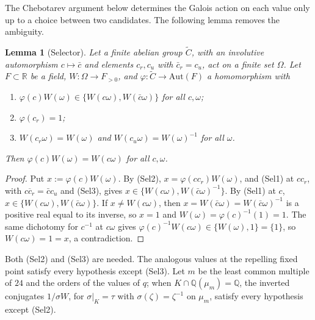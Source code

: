 \documentclass[11pt]{amsart}
\numberwithin{equation}{section}
\theoremstyle{plain}
\newtheorem{lemma}[theorem]{Lemma}
\theoremstyle{definition}
\theoremstyle{remark}
\begin{document}
The Chebotarev argument below determines the Galois action on each value only up to a choice between two candidates. The following lemma removes the ambiguity.

\begin{lemma}[Selector]\label{lem:selector}
Let a finite abelian group \(\widetilde C\), with an involutive automorphism \(c\mapsto\bar c\) and elements \(c_r,c_u\) with \(\bar c_r=c_u\), act on a finite set \(\Omega\). Let \(F\subset\mathbb R\) be a field, \(W:\Omega\to F_{>0}\), and \(\varphi:\widetilde C\to\mathrm{Aut}(F)\) a homomorphism with
\begin{enumerate}
\item[(Sel1)] \(\varphi(c)W(\omega)\in\{W(c\omega),W(\bar c\omega)\}\) for all \(c,\omega\);
\item[(Sel2)] \(\varphi(c_r)=1\);
\item[(Sel3)] \(W(c_r\omega)=W(\omega)\) and \(W(c_u\omega)=W(\omega)^{-1}\) for all \(\omega\).
\end{enumerate}
Then \(\varphi(c)W(\omega)=W(c\omega)\) for all \(c,\omega\).
\end{lemma}

\begin{proof}
Put \(x:=\varphi(c)W(\omega)\). By (Sel2), \(x=\varphi(cc_r)W(\omega)\), and (Sel1) at \(cc_r\), with \(\overline{cc_r}=\bar cc_u\) and (Sel3), gives \(x\in\{W(c\omega),W(\bar c\omega)^{-1}\}\). By (Sel1) at \(c\), \(x\in\{W(c\omega),W(\bar c\omega)\}\). If \(x\ne W(c\omega)\), then \(x=W(\bar c\omega)=W(\bar c\omega)^{-1}\) is a positive real equal to its inverse, so \(x=1\) and \(W(\omega)=\varphi(c)^{-1}(1)=1\). The same dichotomy for \(c^{-1}\) at \(c\omega\) gives \(\varphi(c)^{-1}W(c\omega)\in\{W(\omega),1\}=\{1\}\), so \(W(c\omega)=1=x\), a contradiction.
\end{proof}

Both (Sel2) and (Sel3) are needed. The analogous values at the repelling fixed point satisfy every hypothesis except (Sel3). Let \(m\) be the least common multiple of \(24\) and the orders of the values of \(q\); when \(K\cap\mathbb Q(\mu_m)=\mathbb Q\), the inverted conjugates \(1/\sigma W\), for \(\sigma|_K=\tau\) with \(\sigma(\zeta)=\zeta^{-1}\) on \(\mu_m\), satisfy every hypothesis except (Sel2).
\end{document}
